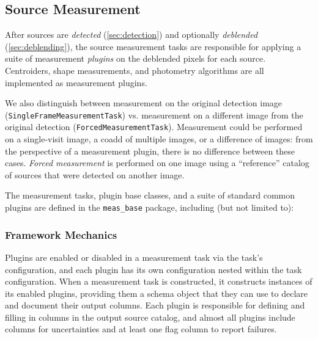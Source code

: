 \subsection{Source Measurement}
\label{sec:measurement}

After sources are \emph{detected} (\ref{sec:detection}) and optionally \emph{deblended} (\ref{sec:deblending}), the source measurement tasks are responsible for applying a suite of measurement \emph{plugins} on the deblended pixels for each source.
Centroiders, shape measurements, and photometry algorithms are all implemented as measurement plugins.

We also distinguish between measurement on the original detection image (\texttt{SingleFrameMeasurementTask}) vs. measurement on a different image from the original detection (\texttt{ForcedMeasurementTask}).
Measurement could be performed on a single-visit image, a coadd of multiple images, or a difference of images: from the perspective of a measurement plugin, there is no difference between these cases.
\textit{Forced measurement} is performed on one image using a ``reference'' catalog of sources that were detected on another image.

The measurement tasks, plugin base classes, and a suite of standard common plugins are defined in the \texttt{meas\_base} package, including (but not limited to):

\subsubsection{Framework Mechanics}
\label{sec:measurement-interfaces}

Plugins are enabled or disabled in a measurement task via the task's configuration, and each plugin has its own configuration nested within the task configuration.
When a measurement task is constructed, it constructs instances of its enabled plugins, providing them a schema object that they can use to declare and document their output columns.
Each plugin is responsible for defining and filling in columns in the output source catalog, and almost all plugins include columns for uncertainties and at least one flag column to report failures.

